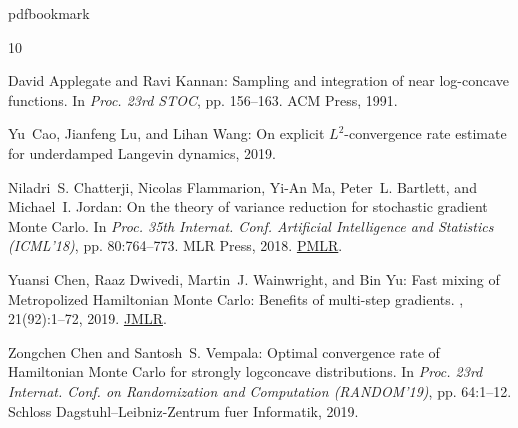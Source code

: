 \newcommand{\prelim}{Preliminary version in\ }\newcommand{\prelims}{Preliminary
  versions in\ }
\providecommand{\bibhead}[1]{}
\expandafter\ifx\csname pdfbookmark\endcsname\relax%
  \providecommand{\tocrefpdfbookmark}{}
\else\providecommand{\tocrefpdfbookmark}{%
   \hypertarget{tocreferences}{}%
   \pdfbookmark[1]{References}{tocreferences}}%
\fi

\tocrefpdfbookmark
\begin{thebibliography}{10}

\bibhead{AK91}
{\sc David Applegate and Ravi Kannan}: Sampling and integration of near
  log-concave functions.
\newblock In {\em Proc. 23rd STOC}, pp. 156--163. ACM Press, 1991.
\newblock [\epfmtdoi{10.1145/103418.103439}]

\bibhead{CLW19}
{\sc Yu~Cao, Jianfeng Lu, and Lihan Wang}: On explicit ${L}^2$-convergence rate
  estimate for underdamped {L}angevin dynamics, 2019.

\bibhead{CFMBJ18}
{\sc Niladri~S. Chatterji, Nicolas Flammarion, Yi-An Ma, Peter~L. Bartlett, and
  Michael~I. Jordan}: On the theory of variance reduction for stochastic
  gradient {M}onte {C}arlo.
\newblock In {\em Proc. 35th Internat. Conf. Artificial Intelligence and
  Statistics (ICML'18)}, pp. 80:764--773. MLR Press, 2018.
\newblock \href{http://proceedings.mlr.press/v80/chatterji18a.html}{PMLR}.

\bibhead{CDWY19}
{\sc Yuansi Chen, Raaz Dwivedi, Martin~J. Wainwright, and Bin Yu}: Fast mixing
  of {M}etropolized {H}amiltonian {M}onte {C}arlo: {B}enefits of multi-step
  gradients.
, 21(92):1--72, 2019.
\newblock \href{https://jmlr.org/papers/v21/19-441.html}{JMLR}.

\bibhead{conf-version}
{\sc Zongchen Chen and Santosh~S. Vempala}: Optimal convergence rate of
  {H}amiltonian {M}onte {C}arlo for strongly logconcave distributions.
\newblock In {\em Proc. 23rd Internat. Conf. on Randomization and Computation
  (RANDOM'19)}, pp. 64:1--12. Schloss Dagstuhl--Leibniz-Zentrum fuer
  Informatik, 2019.


\end{thebibliography}
